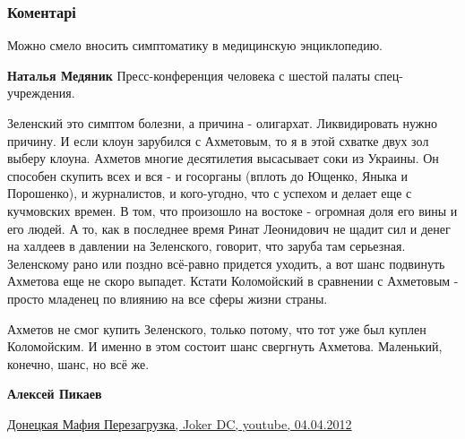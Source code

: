  
 
 
 
 
\subsubsection{Коментарі}
\label{sec:26_11_2021.fb.medvedeva_olesja.3.sindrom_zelenskogo.cmt}

\begin{itemize} %
Можно смело вносить симптоматику в медицинскую энциклопедию.

\begin{itemize} %
\textbf{Наталья Медяник} Пресс-конференция человека с шестой палаты спец-учреждения.
\end{itemize} %


Зеленский это симптом болезни, а причина - олигархат. Ликвидировать нужно
причину. И если клоун зарубился с Ахметовым, то я в этой схватке двух зол
выберу клоуна. Ахметов многие десятилетия высасывает соки из Украины. Он
способен скупить всех и вся - и госорганы (вплоть до Ющенко, Яныка и
Порошенко), и журналистов, и кого-угодно, что с успехом и делает еще с
кучмовских времен. В том, что произошло на востоке - огромная доля его вины и
его людей. А то, как в последнее время Ринат Леонидович не щадит сил и денег на
халдеев в давлении на Зеленского, говорит, что заруба там серьезная. Зеленскому
рано или поздно всё-равно придется уходить, а вот шанс подвинуть Ахметова еще
не скоро выпадет. Кстати Коломойский в сравнении с Ахметовым - просто младенец
по влиянию на все сферы жизни страны.

\begin{itemize} %

Ахметов не смог купить Зеленского, только потому, что тот уже был куплен
Коломойским. И именно в этом состоит шанс свергнуть Ахметова. Маленький,
конечно, шанс, но всё же.

\textbf{Алексей Пикаев} 

\href{https://youtu.be/eANxxUQhHtU}{%
Донецкая Мафия Перезагрузка, Joker DC, youtube, 04.04.2012%
}


\end{itemize}
\end{itemize}
